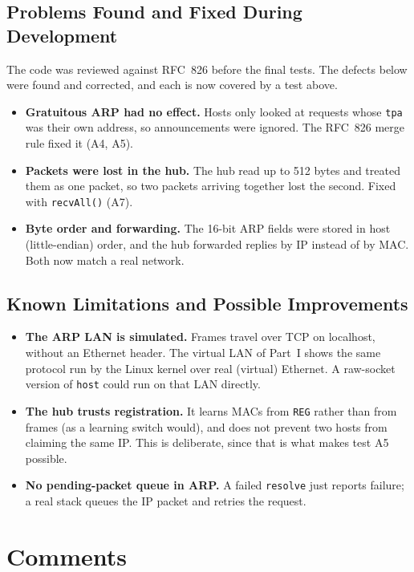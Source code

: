 \documentclass[11pt]{article}
\begin{document}
\subsection{Problems Found and Fixed During Development}
The code was reviewed against RFC~826 before the final tests. The defects below were
found and corrected, and each is now covered by a test above.
\begin{itemize}[leftmargin=1.6em]
  \item \textbf{Gratuitous ARP had no effect.} Hosts only looked at requests whose
  \texttt{tpa} was their own address, so announcements were ignored. The RFC~826 merge
  rule fixed it (A4, A5).
  \item \textbf{Packets were lost in the hub.} The hub read up to 512 bytes and treated
  them as one packet, so two packets arriving together lost the second. Fixed with
  \texttt{recvAll()} (A7).
  \item \textbf{Byte order and forwarding.} The 16-bit ARP fields were stored in host
  (little-endian) order, and the hub forwarded replies by IP instead of by MAC. Both now
  match a real network.
\end{itemize}

\subsection{Known Limitations and Possible Improvements}
\begin{itemize}[leftmargin=1.6em]
  \item \textbf{The ARP LAN is simulated.} Frames travel over TCP on localhost, without an
  Ethernet header. The virtual LAN of Part~I shows the same protocol run by the
  Linux kernel over real (virtual) Ethernet. A raw-socket version of \texttt{host} could
  run on that LAN directly.
  \item \textbf{The hub trusts registration.} It learns MACs from \texttt{REG} rather than
  from frames (as a learning switch would), and does not prevent two hosts from claiming
  the same IP. This is deliberate, since that is what makes test A5 possible.
  \item \textbf{No pending-packet queue in ARP.} A failed \texttt{resolve} just reports
  failure; a real stack queues the IP packet and retries the request.
\end{itemize}


\section{Comments}
\end{document}
